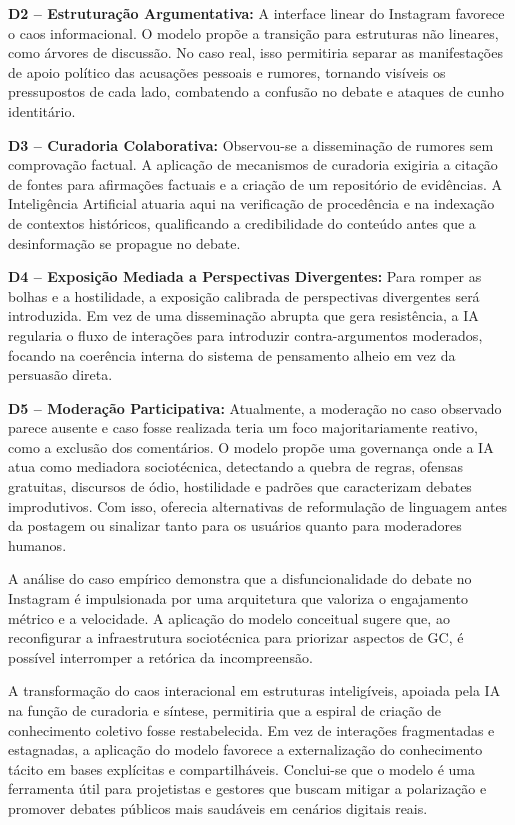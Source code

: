 \documentclass[conference]{IEEEtran} \IEEEoverridecommandlockouts %
\begin{document}
\textbf{D2 -- Estruturação Argumentativa:} A interface linear do Instagram favorece o caos informacional. O modelo propõe a transição para estruturas não lineares, como árvores de discussão. No caso real, isso permitiria separar as manifestações de apoio político das acusações pessoais e rumores,  tornando visíveis os pressupostos de cada lado, combatendo a confusão no debate e ataques de cunho identitário.

\textbf{D3 -- Curadoria Colaborativa:} Observou-se a disseminação de rumores sem comprovação factual. A aplicação de mecanismos de curadoria exigiria a citação de fontes para afirmações factuais e a criação de um repositório de evidências. A Inteligência Artificial atuaria aqui na verificação de procedência e na indexação de contextos históricos, qualificando a credibilidade do conteúdo antes que a desinformação se propague no debate.

\textbf{D4 -- Exposição Mediada a Perspectivas Divergentes:} Para romper as bolhas e a hostilidade, a exposição  calibrada de perspectivas divergentes será introduzida. Em vez de uma disseminação abrupta que gera resistência, a IA regularia o fluxo de interações para introduzir contra-argumentos moderados, focando na coerência interna do sistema de pensamento alheio em vez da persuasão direta.

\textbf{D5 -- Moderação Participativa:} Atualmente, a moderação no caso observado parece ausente e caso fosse realizada teria um foco majoritariamente reativo, como a exclusão dos comentários. O modelo propõe uma governança onde a IA atua como mediadora sociotécnica, detectando a quebra de regras, ofensas gratuitas, discursos de ódio, hostilidade e padrões que caracterizam debates improdutivos. Com isso, oferecia alternativas de reformulação de linguagem antes da postagem ou sinalizar tanto para os usuários quanto para moderadores humanos.

A análise do caso empírico demonstra que a disfuncionalidade do debate no Instagram é impulsionada por uma arquitetura que valoriza o engajamento métrico e a velocidade. A aplicação do modelo conceitual sugere que, ao reconfigurar a infraestrutura sociotécnica para priorizar aspectos de GC, é possível interromper a retórica da incompreensão. 

A transformação do caos interacional em estruturas inteligíveis, apoiada pela IA na função de curadoria e síntese, permitiria que a espiral de criação de conhecimento coletivo fosse restabelecida. Em vez de interações fragmentadas e estagnadas, a aplicação do modelo favorece a externalização do conhecimento tácito em bases explícitas e compartilháveis. Conclui-se que o modelo é uma ferramenta útil para projetistas e gestores que buscam mitigar a polarização e promover debates públicos mais saudáveis em cenários digitais reais.
\end{document}

